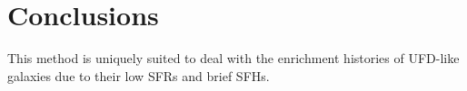 \section {Conclusions}
\label{conc}

This method is uniquely suited to deal with the enrichment histories of UFD-like galaxies due to their low SFRs and brief SFHs. 


